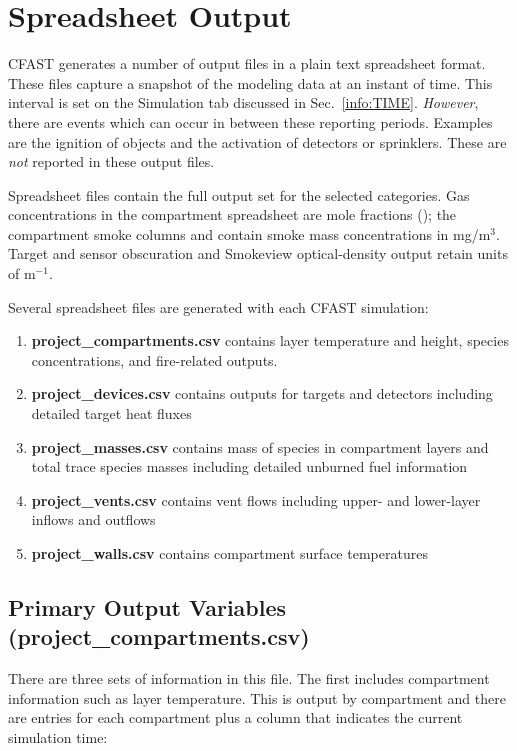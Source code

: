 \section{Spreadsheet Output}

CFAST generates a number of output files in a plain text spreadsheet format.  These files capture a snapshot of the modeling data at an instant of time. This interval is set on the Simulation tab discussed in Sec.~\ref{info:TIME}. \emph{However}, there are events which can occur in between these reporting periods. Examples are the ignition of objects and the activation of detectors or sprinklers. These are \emph{not} reported in these output files.

Spreadsheet files contain the full output set for the selected categories. Gas concentrations in the compartment spreadsheet are mole fractions (); the compartment smoke columns  and  contain smoke mass concentrations in mg/m$^3$. Target and sensor obscuration and Smokeview optical-density output retain units of m$^{-1}$.

Several spreadsheet files are generated with each CFAST simulation:

\begin{enumerate}
\item \textbf{project\_compartments.csv} contains layer temperature and height, species concentrations, and fire-related outputs.
\item \textbf{project\_devices.csv} contains outputs for targets and detectors including detailed target heat fluxes
\item \textbf{project\_masses.csv} contains mass of species in compartment layers and total trace species masses including detailed unburned fuel information
\item \textbf{project\_vents.csv} contains vent flows including upper- and lower-layer inflows and outflows
\item \textbf{project\_walls.csv} contains compartment surface temperatures
\end{enumerate}

\subsection{Primary Output Variables (project\_compartments.csv)}

There are three sets of information in this file. The first includes compartment information such as layer temperature. This is output by compartment and there are entries for each compartment plus a column that indicates the current simulation time:

